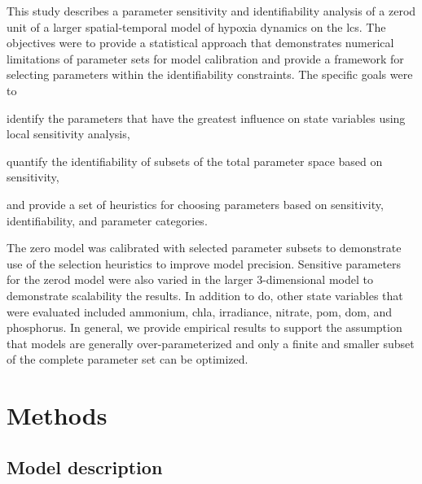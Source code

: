 \documentclass[preprint]{elsarticle}\usepackage[]{graphicx}\usepackage[]{color}
\begin{document}
This study describes a parameter sensitivity and identifiability analysis of a \ac{zerod} unit of a larger spatial-temporal model of hypoxia dynamics on the \ac{lcs}.  The objectives were to provide a statistical approach that demonstrates numerical limitations of parameter sets for model calibration and provide a framework for selecting parameters within the identifiability constraints.  The specific goals were to \begin{inparaenum}[1\upshape)]
\item identify the parameters that have the greatest influence on state variables using local sensitivity analysis,
\item quantify the identifiability of subsets of the total parameter space based on sensitivity,
\item and provide a set of heuristics for choosing parameters based on sensitivity, identifiability, and parameter categories.
\end{inparaenum}
The \ac{zero} model was calibrated with selected parameter subsets to demonstrate use of the selection heuristics to improve model precision.  Sensitive parameters for the \ac{zerod} model were also varied in the larger 3-dimensional model to demonstrate scalability the results. In addition to \ac{do}, other state variables that were evaluated included ammonium, \ac{chla}, irradiance, nitrate, \ac{pom}, \ac{dom}, and phosphorus. In general, we provide empirical results to support the assumption that models are generally over-parameterized and only a finite and smaller subset of the complete parameter set can be optimized.

\section{Methods}

\subsection{Model description}
\end{document}
